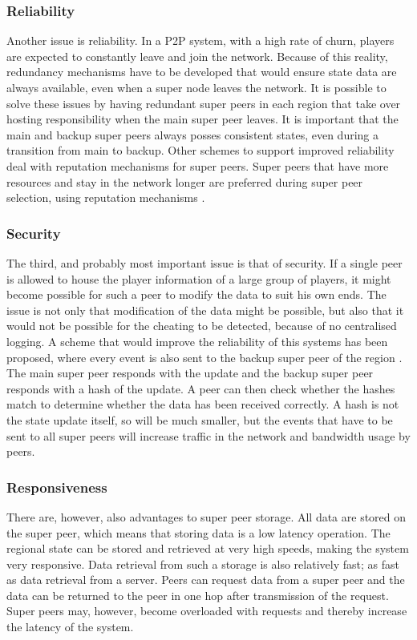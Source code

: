 \documentclass[10pt,a4paper,journal,cspaper,compsoc]{IEEEtran}
\begin{document}
\subsubsection{Reliability}
\label{super_peer_storage_reliability}

Another issue is reliability. In a P2P system, with a high rate of churn, players are expected to constantly leave and join the network. Because of
this reality, redundancy mechanisms have to be developed that would ensure state data are always available, even when a super node leaves the
network. It is possible to solve these issues by having redundant super peers in each region that take over hosting responsibility when the main
super peer leaves. It is important that the main and backup super peers always posses consistent states, even during a transition from main to
backup. Other schemes to support improved reliability deal with reputation mechanisms for super peers. Super peers that have more resources and stay
in the network longer are preferred during super peer selection, using reputation mechanisms \cite{fan_mediator_paper}.

\subsubsection{Security}
The third, and probably most important issue is that of security. If a single peer is allowed to house the player information of a large group of
players, it might become possible for such a peer to modify the data to suit his own ends. The issue is not only that modification of the data might
be possible, but also that it would not be possible for the cheating to be detected, because of no centralised logging. A scheme that would improve
the reliability of this systems has been proposed, where every event is also sent to the backup super peer of the region \cite{past_storage_focus}.
The main super peer responds with the update and the backup super peer responds with a hash of the update. A peer can then check whether the hashes
match to determine whether the data has been received correctly. A hash is not the state update itself, so will be much smaller, but the events that
have to be sent to all super peers will increase traffic in the network and bandwidth usage by peers.

\subsubsection{Responsiveness}
There are, however, also advantages to super peer storage. All data are stored on the super peer, which means that storing data is a low latency
operation. The regional state can be stored and retrieved at very high speeds, making the system very responsive. Data retrieval from such a storage
is also relatively fast; as fast as data retrieval from a server. Peers can request data from a super peer and the data can be returned to the peer
in one hop after transmission of the request. Super peers may, however, become overloaded with requests and thereby increase the latency of the
system.
\end{document}
